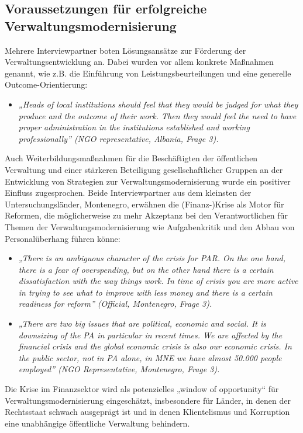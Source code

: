 \subsection{Voraussetzungen für erfolgreiche Verwaltungsmodernisierung }
Mehrere Interviewpartner boten Lösungsansätze zur Förderung der Verwaltungsentwicklung an. Dabei wurden vor allem konkrete Maßnahmen genannt, wie z.B. die Einführung von Leistungsbeurteilungen und eine generelle Outcome-Orientierung:
\begin{itemize}[label={}]
\item \textit{„Heads of local institutions should feel that they would be judged for what they produce and the outcome of their work. Then they would feel the need to have proper administration in the institutions established and working professionally” (NGO representative, Albania, Frage 3).}
\end{itemize}
Auch Weiterbildungsmaßnahmen für die Beschäftigten der öffentlichen Verwaltung und einer stärkeren Beteiligung gesellschaftlicher Gruppen an der Entwicklung von Strategien zur Verwaltungsmodernisierung wurde ein positiver Einfluss zugesprochen. Beide Interviewpartner aus dem kleinsten der Untersuchungsländer, Montenegro, erwähnen die (Finanz-)Krise als Motor für Reformen, die möglicherweise zu mehr Akzeptanz bei den Verantwortlichen für Themen der Verwaltungsmodernisierung wie Aufgabenkritik und den Abbau von Personalüberhang führen könne:
\begin{itemize}[label={}]
\item \textit{„There is an ambiguous character of the crisis for PAR. On the one hand, there is a fear of overspending, but on the other hand there is a certain dissatisfaction with the way things work. In time of crisis you are more active in trying to see what to improve with less money and there is a certain readiness for reform” (Official, Montenegro, Frage 3). }
\item \textit{„There are two big issues that are political, economic and social. It is downsizing of the PA in particular in recent times. We are affected by the financial crisis and the global economic crisis is also our economic crisis. In the public sector, not in PA alone, in MNE we have almost 50.000 people employed” (NGO Representative, Montenegro, Frage 3). }
\end{itemize}
Die Krise im Finanzsektor wird als potenzielles „window of opportunity“ für Verwaltungsmodernisierung eingeschätzt, insbesondere für Länder, in denen der Rechtsstaat schwach ausgeprägt ist und in denen Klientelismus und Korruption eine unabhängige öffentliche Verwaltung behindern.\par
